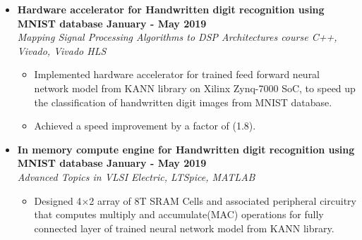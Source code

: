 \documentclass[a4paper,11pt]{article}
\newcommand{\isep}{-2 pt}
\newcommand{\spsep}{-0.75cm}
\begin{document}
\begin{itemize}
	 \item \textbf{Hardware accelerator for Handwritten digit recognition using MNIST database \hfill January - May 2019} \\
	\emph{Mapping Signal Processing Algorithms to DSP Architectures course \hfill C++, Vivado, Vivado HLS} \\[\spsep]
	\begin{itemize} \itemsep \isep
	\item Implemented hardware accelerator for trained feed forward neural network model from KANN library on Xilinx Zynq-7000 SoC, to speed up the classification of handwritten digit images from MNIST database.
		\item Achieved a speed improvement by a factor of (1.8).
	\end{itemize}

\iffalse
	
	\item \textbf{In memory compute engine for Handwritten digit recognition using MNIST database  \hfill January - May 2019} \\
	\emph{Advanced Topics in VLSI \hfill  Electric, LTSpice, MATLAB} \\[\spsep]
	\begin{itemize} \itemsep \isep
		\item Designed 4$\times$2 array of 8T SRAM Cells and associated peripheral circuitry that computes multiply and accumulate(MAC) operations for fully connected layer of trained neural network model from KANN library.

	\end{itemize}
	

\end{itemize}
\end{document}
